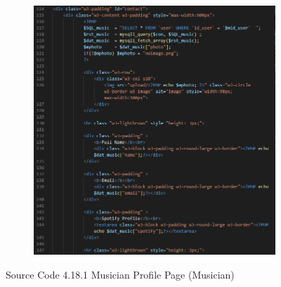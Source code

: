 \begin{enumerate}[1.]
\begin{figure}[h]
\begin{subfigure}[b]{0.7\textwidth}
            \includegraphics[width=\textwidth]{mainmatter/images/frontend/code/mprofile2.png}
            \label{fig:sub2}
        \end{subfigure}
        \caption*{Source Code 4.18.1 Musician Profile Page (Musician)}
        \label{fig:myfig57a}
    \end{figure}
    \begin{figure}[h]\ContinuedFloat
        \centering
        \begin{subfigure}[b]{0.7\textwidth}
            \centering

\end{subfigure}
\end{figure}
\end{enumerate}
